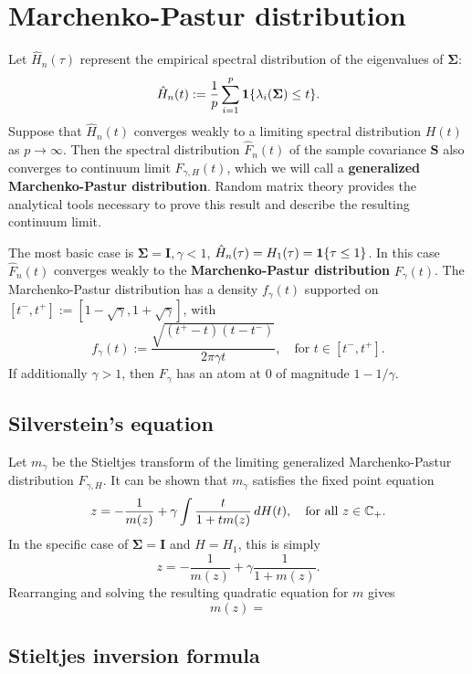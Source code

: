 \documentclass{article}
\newcommand{\bSigma}{\boldsymbol{\Sigma}}
\newcommand{\bS}{\boldsymbol{S}}
\newcommand{\bI}{\boldsymbol{I}}
\begin{document}
\section{Marchenko-Pastur distribution}
Let $\hat{H}_n(\tau)$ represent the empirical spectral distribution of the eigenvalues of $\bSigma$:
$$
\hat{H}_n(t) := \frac{1}{p} \sum_{i = 1}^{p} \1\{\lambda_i(\bSigma) \leq t\}.
$$
Suppose that $\hat{H}_n(t)$ converges weakly to a limiting spectral distribution $H(t)$ as $p \to \infty$. Then the spectral distribution $\hat{F}_n(t)$ of the sample covariance $\bS$ also converges to continuum limit $F_{\gamma,H}(t)$, which we will call a {\bf generalized Marchenko-Pastur distribution}. Random matrix theory provides the analytical tools necessary to prove this result and describe the resulting continuum limit.

The most basic case is $\bSigma = \bI, \gamma < 1$, $\hat{H}_n(\tau) = H_1(\tau) = \mathbf{1}\{\tau \leq 1\}$. In this case $\hat{F}_n(t)$ converges weakly to the {\bf Marchenko-Pastur distribution} $F_{\gamma}(t)$. The Marchenko-Pastur distribution has a density $f_{\gamma}(t)$ supported on $[t^{-},t^{+}] := [1 - \sqrt{\gamma}, 1 + \sqrt{\gamma}]$, with 
$$
f_{\gamma}(t) := \frac{\sqrt{(t^{+} - t)(t - t^{-})}}{2 \pi \gamma t}, \quad \textrm{for $t \in [t^{-},t^{+}]$.}
$$
If additionally $\gamma > 1$, then $F_{\gamma}$ has an atom at $0$ of magnitude $1 - 1/\gamma$. 

\subsection{Silverstein's equation}
Let $m_{\gamma}$ be the Stieltjes transform of the limiting generalized Marchenko-Pastur distribution $F_{\gamma,H}$. It can be shown that $m_{\gamma}$ satisfies the fixed point equation
$$
z = -\frac{1}{m(z)} + \gamma \int \frac{t}{1 + tm(z)} \,dH(t), \quad \textrm{for all $z \in \mathbb{C}_{+}$.}
$$
In the specific case of $\bSigma = \bI$ and $H = H_1$, this is simply
$$
z = -\frac{1}{m(z)} + \gamma \frac{1}{1 + m(z)}.
$$
Rearranging and solving the resulting quadratic equation for $m$ gives
$$
m(z) = 
$$

\subsection{Stieltjes inversion formula}

	
	
\end{document}
